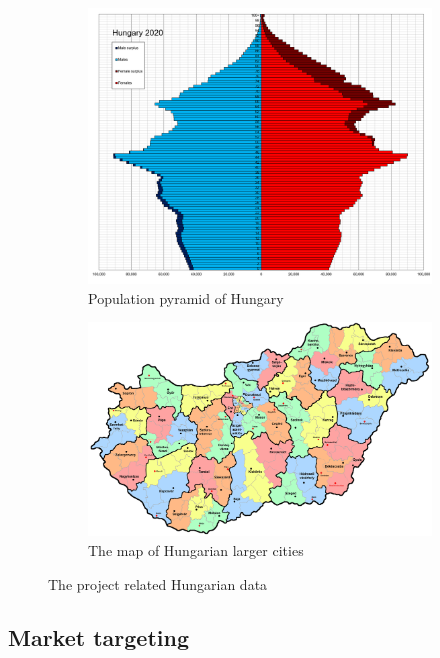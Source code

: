 \begin{figure}[H]
  \centering
  \begin{subfigure}[t]{0.45\textwidth}
  	\centering
  	\includegraphics[width=0.8\linewidth]{pics/hungary.png}
  	\caption{Population pyramid of Hungary \cite{wiki1}}
  \end{subfigure}
  \begin{subfigure}[t]{0.45\textwidth}
  	\centering
  	\includegraphics[width=\linewidth]{pics/magyar.jpg}
  	\caption{\centering The map of Hungarian larger cities \cite{terkep}}
  \end{subfigure}
  \caption{The  project related Hungarian data}
  \label{fig:hu}
\end{figure}

\subsection{Market targeting}

